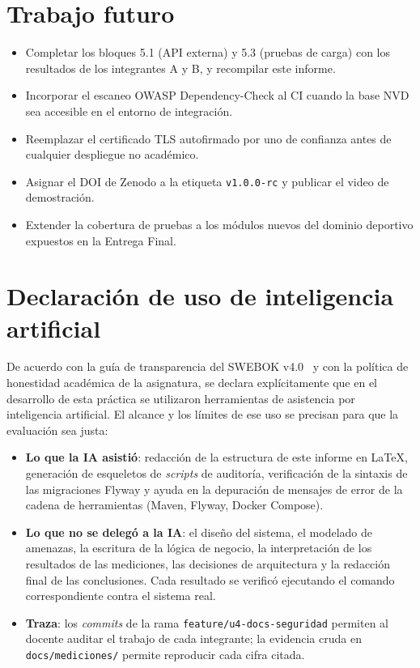 \documentclass[11pt,a4paper]{article}
\newcommand{\ruta}[1]{\texttt{\footnotesize #1}}
\begin{document}
\section{Trabajo futuro}

\begin{itemize}[leftmargin=*]
  \item Completar los bloques 5.1 (API externa) y 5.3 (pruebas de carga) con
    los resultados de los integrantes A y B, y recompilar este informe.
  \item Incorporar el escaneo OWASP Dependency-Check al CI cuando la base NVD
    sea accesible en el entorno de integración.
  \item Reemplazar el certificado TLS autofirmado por uno de confianza antes
    de cualquier despliegue no académico.
  \item Asignar el DOI de Zenodo a la etiqueta \texttt{v1.0.0-rc} y publicar
    el video de demostración.
  \item Extender la cobertura de pruebas a los módulos nuevos del dominio
    deportivo expuestos en la Entrega Final.
\end{itemize}

\section{Declaración de uso de inteligencia artificial}
\label{sec:ia}

De acuerdo con la guía de transparencia del SWEBOK v4.0~\cite{swebok2024} y
con la política de honestidad académica de la asignatura, se declara
explícitamente que en el desarrollo de esta práctica se utilizaron
herramientas de asistencia por inteligencia artificial. El alcance y los
límites de ese uso se precisan para que la evaluación sea justa:

\begin{itemize}[leftmargin=*]
  \item \textbf{Lo que la IA asistió}: redacción de la estructura de este
    informe en \LaTeX, generación de esqueletos de \emph{scripts} de
    auditoría, verificación de la sintaxis de las migraciones Flyway y ayuda
    en la depuración de mensajes de error de la cadena de herramientas
    (Maven, Flyway, Docker Compose).
  \item \textbf{Lo que no se delegó a la IA}: el diseño del sistema, el
    modelado de amenazas, la escritura de la lógica de negocio, la
    interpretación de los resultados de las mediciones, las decisiones de
    arquitectura y la redacción final de las conclusiones. Cada resultado se
    verificó ejecutando el comando correspondiente contra el sistema real.
  \item \textbf{Traza}: los \emph{commits} de la rama
    \texttt{feature/u4-docs-seguridad} permiten al docente auditar el trabajo
    de cada integrante; la evidencia cruda en \ruta{docs/mediciones/} permite
    reproducir cada cifra citada.
\end{itemize}
\end{document}
